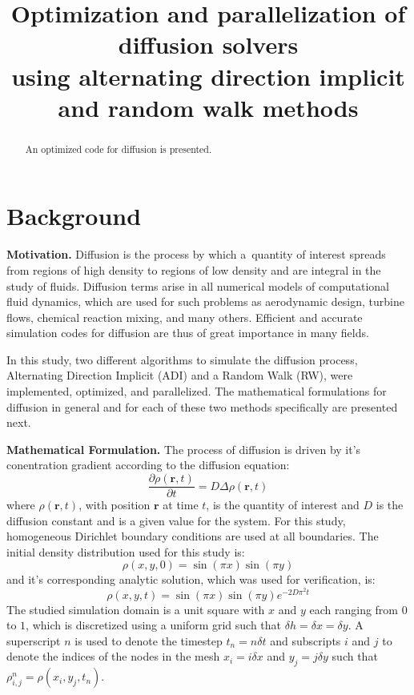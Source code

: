 \documentclass[letterpaper]{article}
\title{Optimization and parallelization of diffusion solvers\\
using alternating direction implicit and random walk methods}
\newcommand{\mypar}[1]{{\bf #1.}}
\begin{document}
%
\maketitle
%


\begin{abstract}
An optimized code for diffusion is presented. 
\end{abstract}


\section{Background}\label{sec:background}

\mypar{Motivation} 
Diffusion is the process by which a~quantity of interest spreads from regions of high density to regions of low density and are integral in the study of fluids. Diffusion terms arise in all numerical models of computational fluid dynamics, which are used for such problems as aerodynamic design, turbine flows, chemical reaction mixing, and many others. Efficient and accurate simulation codes for diffusion are thus of great importance in many fields.

In this study, two different algorithms to simulate the diffusion process, Alternating Direction Implicit (ADI) and a Random Walk (RW), were implemented, optimized, and parallelized. The mathematical formulations for diffusion in general and for each of these two methods specifically are presented next.

\mypar{Mathematical Formulation}
The process of diffusion is driven by it's conentration gradient according to the diffusion equation:
\begin{equation}
\frac{\partial \rho(\mathbf{r},t)}{\partial t} = D\Delta\rho(\mathbf{r},t)
\end{equation}
where $\rho(\mathbf{r},t)$, with position $\mathbf{r}$ at time $t$, is the quantity of interest and $D$ is the diffusion constant and is a given value for the system. For this study, homogeneous Dirichlet boundary conditions are used at all boundaries. The initial density distribution used for this study is:
\begin{equation}
\rho(x,y,0)=\sin(\pi x)\sin(\pi y)
\end{equation}
and it's corresponding analytic solution, which was used for verification, is:
\begin{equation}
\rho(x,y,t)=\sin(\pi x)\sin(\pi y)e^{-2D\pi^{2}t}
\end{equation}
The studied simulation domain is a unit square with $x$ and $y$ each ranging from $0$ to $1$, which is discretized using a uniform grid such that $\delta h=\delta x=\delta y$. A superscript $n$ is used to denote the timestep $t_n=n\delta t$ and subscripts $i$ and $j$ to denote the indices of the nodes in the mesh $x_i=i\delta x$ and $y_j=j\delta y$ such that $\rho_{i,j}^{n}=\rho(x_i,y_j,t_n)$.
\end{document}
